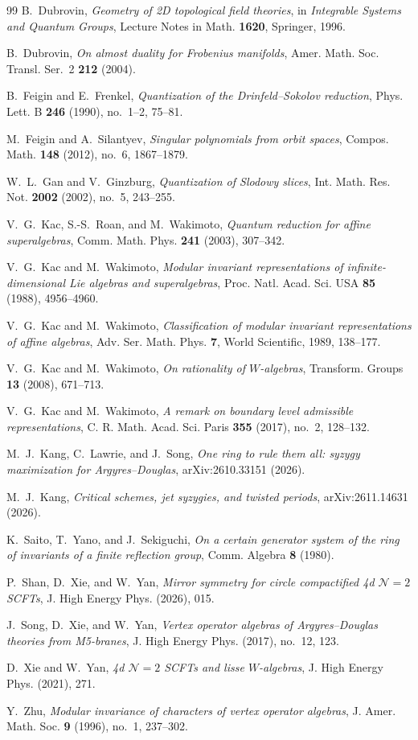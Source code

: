\documentclass[11pt,reqno]{amsart}
\theoremstyle{remark}
\begin{document}
\begin{thebibliography}{99}
B.~Dubrovin,
\emph{Geometry of 2D topological field theories},
in \emph{Integrable Systems and Quantum Groups},
Lecture Notes in Math. \textbf{1620}, Springer, 1996.

B.~Dubrovin,
\emph{On almost duality for Frobenius manifolds},
Amer. Math. Soc. Transl. Ser.~2 \textbf{212} (2004).

B.~Feigin and E.~Frenkel,
\emph{Quantization of the Drinfeld--Sokolov reduction},
Phys. Lett. B \textbf{246} (1990), no.~1--2, 75--81.

M.~Feigin and A.~Silantyev,
\emph{Singular polynomials from orbit spaces},
Compos. Math. \textbf{148} (2012), no.~6, 1867--1879.

 W.~L.~Gan and V.~Ginzburg, \emph{Quantization of Slodowy slices}, Int. Math. Res. Not. \textbf{2002} (2002), no.~5, 243--255.

V.~G.~Kac, S.-S.~Roan, and M.~Wakimoto,
\emph{Quantum reduction for affine superalgebras},
Comm. Math. Phys. \textbf{241} (2003), 307--342.

V.~G.~Kac and M.~Wakimoto,
\emph{Modular invariant representations of infinite-dimensional Lie
algebras and superalgebras},
Proc. Natl. Acad. Sci. USA \textbf{85} (1988), 4956--4960.

V.~G.~Kac and M.~Wakimoto,
\emph{Classification of modular invariant representations of affine
algebras},
Adv. Ser. Math. Phys. \textbf{7}, World Scientific, 1989, 138--177.

V.~G.~Kac and M.~Wakimoto,
\emph{On rationality of $W$-algebras},
Transform. Groups \textbf{13} (2008), 671--713.


V.~G.~Kac and M.~Wakimoto,
\emph{A remark on boundary level admissible representations},
C. R. Math. Acad. Sci. Paris \textbf{355} (2017), no.~2, 128--132.

M.~J.~Kang, C.~Lawrie, and J.~Song,
\emph{One ring to rule them all: syzygy maximization for
Argyres--Douglas},
arXiv:2610.33151 (2026).

M.~J.~Kang,
\emph{Critical schemes, jet syzygies, and twisted periods},
arXiv:2611.14631 (2026).

K.~Saito, T.~Yano, and J.~Sekiguchi,
\emph{On a certain generator system of the ring of invariants of a
finite reflection group},
Comm. Algebra \textbf{8} (1980).

P.~Shan, D.~Xie, and W.~Yan,
\emph{Mirror symmetry for circle compactified 4d $\mathcal N=2$
SCFTs},
J. High Energy Phys. (2026), 015.

J.~Song, D.~Xie, and W.~Yan,
\emph{Vertex operator algebras of Argyres--Douglas theories from
M5-branes},
J. High Energy Phys. (2017), no.~12, 123.

D.~Xie and W.~Yan,
\emph{4d $\mathcal N=2$ SCFTs and lisse $W$-algebras},
J. High Energy Phys. (2021), 271.

Y.~Zhu,
\emph{Modular invariance of characters of vertex operator algebras},
J. Amer. Math. Soc. \textbf{9} (1996), no.~1, 237--302.

\end{thebibliography}
\end{document}
